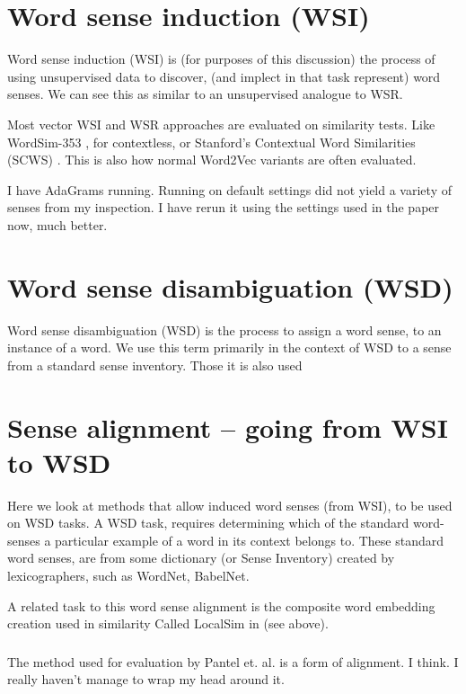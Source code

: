 \documentclass{article}
\begin{document}

\section{Word sense induction (WSI)}
Word sense induction (WSI) is (for purposes of this discussion) the process of using unsupervised data to discover, (and implect in that task represent) word senses.
We can see this as similar to an unsupervised analogue to WSR.

Most vector WSI and WSR approaches are evaluated on similarity tests.
Like WordSim-353 \cite{WordSim353}, for contextless, or Stanford's Contextual Word Similarities (SCWS) \cite{Huang2012}. This is also how normal Word2Vec variants are often evaluated.







I have AdaGrams running. Running on default settings did not yield a variety of senses from my inspection. I have rerun it using the settings used in the paper now, much better.



\section{Word sense disambiguation (WSD)}
Word sense disambiguation (WSD) is the process to assign a word sense, to an instance of a word. We use this term primarily in the context of WSD to a sense from a standard sense inventory. Those it is also used 



\section{Sense alignment -- going from WSI to WSD}
Here we look at methods that allow induced word senses (from WSI), to be used on WSD tasks.
A WSD task, requires determining which of the standard word-senses a particular example of a word in its context belongs to.
These standard word senses, are from some dictionary (or Sense Inventory) created by 
lexicographers, such as WordNet, BabelNet.

A related task to this word sense alignment is the composite word embedding creation used in similarity Called LocalSim in \textcite{Huang2012} (see above).



\subsubsection{\textcite {pantel2002WSI}}
The method used for evaluation by Pantel et. al. is a form of alignment. I think.
I really haven't manage to wrap my head around it.


\end{document}
